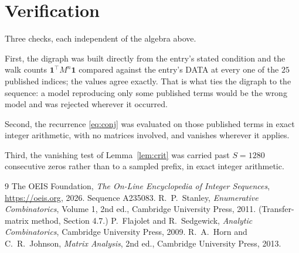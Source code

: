\documentclass[11pt,a4paper]{article}
\theoremstyle{plain}
\theoremstyle{definition}
\begin{document}
\section{Verification}

Three checks, each independent of the algebra above.

First, the digraph was built directly from the entry's stated condition and the walk counts
$\mathbf{1}^{\!\top}M^{n}\mathbf{1}$ compared against the entry's DATA at every one of
the $25$ published indices; the values agree exactly. That is what ties the digraph to
the sequence: a model reproducing only some published terms would be the wrong model and
was rejected wherever it occurred.

Second, the recurrence \eqref{eq:conj} was evaluated on those published terms in exact
integer arithmetic, with no matrices involved, and vanishes wherever it applies.

Third, the vanishing test of Lemma~\ref{lem:crit} was carried past $S=1280$ consecutive
zeros rather than to a sampled prefix, in exact integer arithmetic.

\begin{thebibliography}{9}
 The OEIS Foundation, \emph{The On-Line Encyclopedia of Integer
Sequences}, \url{https://oeis.org}, 2026. Sequence A235083.
 R.~P.~Stanley, \emph{Enumerative Combinatorics}, Volume 1, 2nd ed.,
Cambridge University Press, 2011. (Transfer-matrix method, Section 4.7.)
 P.~Flajolet and R.~Sedgewick, \emph{Analytic Combinatorics}, Cambridge
University Press, 2009.
 R.~A.~Horn and C.~R.~Johnson, \emph{Matrix Analysis}, 2nd ed., Cambridge
University Press, 2013.
\end{thebibliography}
\end{document}
